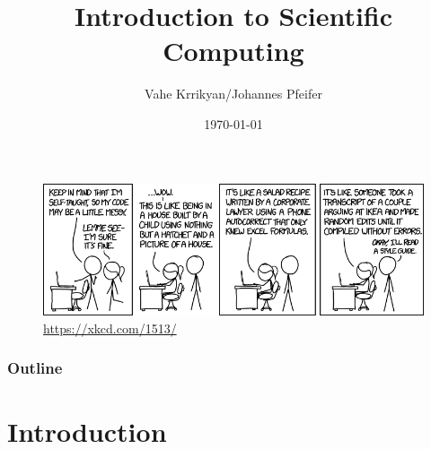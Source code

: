 \documentclass{beamer}
\title[Intro to Scientific Computing]{Introduction to Scientific Computing} %
\author{Vahe Krrikyan/Johannes Pfeifer} %
\institute[CDSE] %
{
University of Mannheim \\ %
\medskip
\textit{pfeifer@uni-mannheim.de} %
}
\date{\today} %
\begin{document}
\begin{frame}
\titlepage %
\end{frame}

\begin{frame}
\begin{figure}
\includegraphics[scale=0.5]{code_quality}
\caption{\url{https://xkcd.com/1513/}}
\end{figure}
\end{frame}

\begin{frame}
\frametitle{Outline} %
\tableofcontents %
\end{frame}

\section{Introduction}
\end{document}
